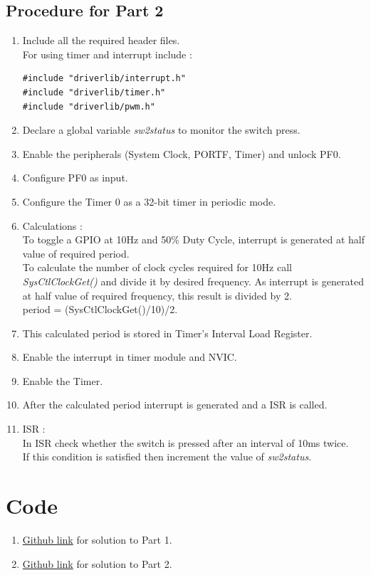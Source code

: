 \documentclass[a4paper,12pt,oneside]{book}
\begin{document}
\subsection{Procedure for Part 2}
\begin{enumerate}
\item Include all the required header files.\\
For using timer and interrupt include :
\begin{lstlisting}
#include "driverlib/interrupt.h"
#include "driverlib/timer.h"
#include "driverlib/pwm.h"
\end{lstlisting}
\item Declare a global variable \textit{sw2status} to monitor the switch press.
\item Enable the peripherals (System Clock, PORTF, Timer) and unlock PF0.
\item Configure PF0 as input. 
\item Configure the Timer 0 as a 32-bit timer in periodic mode.
\item Calculations :\\
To toggle a GPIO at 10Hz and 50\% Duty Cycle, interrupt is generated at half value of required period.\\
To calculate the number of clock cycles required for 10Hz call \textit{SysCtlClockGet()} and divide it by desired frequency. As interrupt is generated at half value of required frequency, this result is divided by 2. \\
period = (SysCtlClockGet()/10)/2.
\item This calculated period is stored in Timer's Interval Load Register.
\item Enable the interrupt in timer module and NVIC.
\item Enable the Timer.
\item After the calculated period interrupt is generated and a ISR is called.
\item ISR : \\
In ISR check whether the switch is pressed after an interval of 10ms twice.\\
If this condition is satisfied then increment the value of \textit{sw2status}.
\end{enumerate}
\newpage
\section{Code}
\begin{enumerate}
\item \href{https://github.com/eYSIP-2016/eYSIP-2016-Around-the-world-of-Embedded-Systems/blob/origin/master/Solutions/lab2\%20solutions/lab2_1solution.c}{Github link} for solution to Part 1.
\item \href{https://github.com/eYSIP-2016/eYSIP-2016-Around-the-world-of-Embedded-Systems/blob/origin/master/Solutions/lab2\%20solutions/lab2_2solution.c}{Github link} for solution to Part 2.
\end{enumerate}
\end{document}
